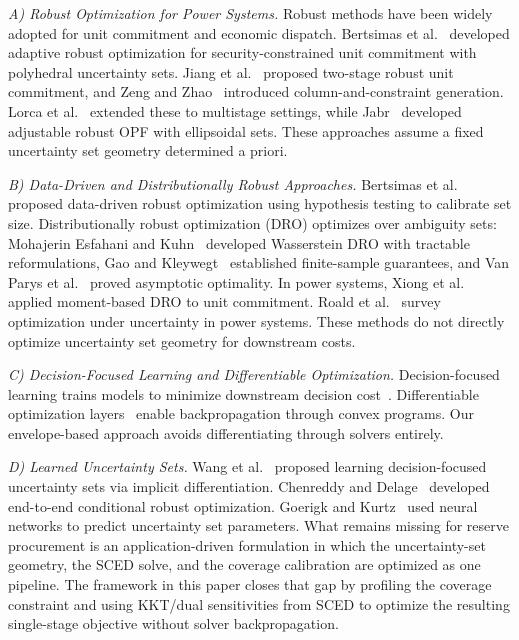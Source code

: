 \documentclass[11pt]{article}
\theoremstyle{definition}
\begin{document}
\emph{A) Robust Optimization for Power Systems.}
Robust methods have been widely adopted for unit commitment and economic dispatch. Bertsimas et al.~\citep{bertsimas2013adaptive} developed adaptive robust optimization for security-constrained unit commitment with polyhedral uncertainty sets. Jiang et al.~\citep{jiang2012robust} proposed two-stage robust unit commitment, and Zeng and Zhao~\citep{zeng2013solving} introduced column-and-constraint generation. Lorca et al.~\citep{lorca2016multistage} extended these to multistage settings, while Jabr~\citep{jabr2013adjustable} developed adjustable robust OPF with ellipsoidal sets. These approaches assume a fixed uncertainty set geometry determined a priori.

\emph{B) Data-Driven and Distributionally Robust Approaches.}
Bertsimas et al.~\citep{bertsimas2018datadriven} proposed data-driven robust optimization using hypothesis testing to calibrate set size. Distributionally robust optimization (DRO) optimizes over ambiguity sets: Mohajerin Esfahani and Kuhn~\citep{esfahani2018data} developed Wasserstein DRO with tractable reformulations, Gao and Kleywegt~\citep{gao2023distributionally} established finite-sample guarantees, and Van Parys et al.~\citep{vanparys2021data} proved asymptotic optimality. In power systems, Xiong et al.~\citep{xiong2017distributionally} applied moment-based DRO to unit commitment. Roald et al.~\citep{roald2023power} survey optimization under uncertainty in power systems. These methods do not directly optimize uncertainty set geometry for downstream costs.

\emph{C) Decision-Focused Learning and Differentiable Optimization.}
Decision-focused learning trains models to minimize downstream decision cost~\citep{elmachtoub2022smart,donti2017task}. Differentiable optimization layers~\citep{amos2017optnet,agrawal2019differentiable,bolte2021nonsmooth} enable backpropagation through convex programs. Our envelope-based approach avoids differentiating through solvers entirely.

\emph{D) Learned Uncertainty Sets.}
Wang et al.~\citep{wang2023learning} proposed learning decision-focused uncertainty sets via implicit differentiation. Chenreddy and Delage~\citep{chenreddy2024end} developed end-to-end conditional robust optimization. Goerigk and Kurtz~\citep{goerigk2023data} used neural networks to predict uncertainty set parameters. What remains missing for reserve procurement is an application-driven formulation in which the uncertainty-set geometry, the SCED solve, and the coverage calibration are optimized as one pipeline. The framework in this paper closes that gap by profiling the coverage constraint and using KKT/dual sensitivities from SCED to optimize the resulting single-stage objective without solver backpropagation.
\end{document}
